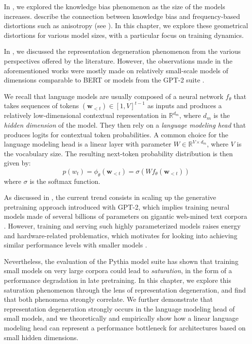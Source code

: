 In , we explored the knowledge bias phenomenon as the size of the models increases. \citet{zhou2021freqbased} describe the connection between knowledge bias and frequency-based distortions such as anisotropy (see ). In this chapter, we explore these geometrical distortions for various model sizes, with a particular focus on training dynamics.

In , we discussed the representation degeneration phenomenon from the various perspectives offered by the literature. However, the observations made in the aforementioned works were mostly made on relatively small-scale models of dimensions comparable to BERT \citep{devlin-etal-2019-bert} or models from the GPT-2 suite \citep{gpt2}.

We recall that language models are usually composed of a neural network $f_\theta$ that takes sequences of tokens $(\mathbf{w}_{<t}) \in [1,V]^{t-1}$ as inputs and produces a relatively low-dimensional contextual representation in $\mathbb{R}^{d_m}$, where $d_m$ is the \textit{hidden dimension} of the model. They then rely on a \textit{language modeling head} that produces logits for contextual token probabilities. A common choice for the language modeling head is a linear layer with parameter $W \in \mathbb{R}^{V \times d_m}$, where $V$ is the vocabulary size. The resulting next-token probability distribution is then given by:
$$
p(w_t) = \phi_\theta(\mathbf{w}_{<t}) = \sigma (W f_\theta(\mathbf{w}_{<t}))
$$
where $\sigma$ is the softmax function.

As discussed in , the current trend consists in scaling up the generative pretraining approach introduced with GPT-2, which implies training neural models made of several billions of parameters on gigantic web-mined text corpora \citep{brown2020language, touvron2023llama, almazrouei2023falcon, jiang2023mistral}. However, training and serving such highly parameterized models raises energy and hardware-related problematics, which motivates for looking into achieving similar performance levels with smaller models \citep{beyond_chinchilla}.

Nevertheless, the evaluation of the Pythia model suite \citep{biderman2023pythia} has shown that training small models on very large corpora could lead to \textit{saturation}, in the form of a performance degradation in late pretraining. In this chapter, we explore this saturation phenomenon through the lens of representation degeneration, and find that both phenomena strongly correlate. We further demonstrate that representation degeneration strongly occurs in the language modeling head of small models, and we theoretically and empirically show how a linear language modeling head can represent a performance bottleneck for architectures based on small hidden dimensions.

